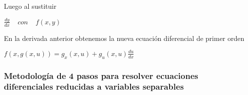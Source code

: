 \documentclass[l etterpaper,11pt]{article}
\begin{document}
Luego al sustituir 
\begin{center}

$\frac{dy}{dx}\ \ \ \ \ con\ \ \ \ \ f(x,y)$\\
\end{center}

En la derivada anterior obtenemos la nueva ecuación diferencial de primer orden 
\begin{center}


$f(x,g(x,u))=g_x(x,u)+g_u(x,u)\frac{du}{dx}$\\
\end{center}



\subsubsection{Metodología de 4 pasos para resolver ecuaciones diferenciales reducidas a variables separables}
\end{document}

